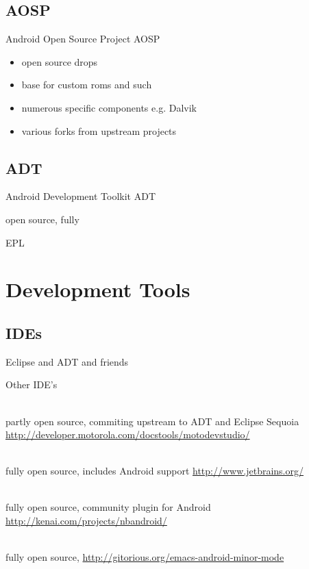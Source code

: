 \documentclass[aspectratio=169]{beamer}
\newcommand{\surl}[1] {{\tiny \url{#1}}}
\begin{document}
  \subsection{AOSP}
    \begin{frame}{Android Open Source Project AOSP}
      \begin{itemize}
        \item<1->open source drops
        \item<2->base for custom roms and such
        \item<3->numerous specific components e.g. Dalvik
        \item<4->various forks from upstream projects
      \end{itemize}
    \end{frame}

  \subsection{ADT}
    \begin{frame}{Android Development Toolkit ADT}
      \begin{description}
        \item<1->open source, fully 
        \item<2->EPL
      \end{description}
    \end{frame}

\section{Development Tools}

  \subsection{IDEs}

    \begin{frame}{Eclipse and ADT and friends}
      
    \end{frame}

    \begin{frame}{Other IDE's}
      \begin{description}
        \item<1->[Motorola Motodev Studio for Android] \hfill \\  partly open source, commiting upstream to ADT and Eclipse Sequoia \surl{http://developer.motorola.com/docstools/motodevstudio/}
        \item<2->[Jetbrains IntelliJ IDEA CE] \hfill \\ fully open source, includes Android support \surl{http://www.jetbrains.org/}
        \item<3->[Oracle Netbeans] \hfill \\ fully open source, community plugin for Android \surl{http://kenai.com/projects/nbandroid/}
        \item<4->[Emacs] \hfill \\ fully open source, \surl{http://gitorious.org/emacs-android-minor-mode}
      \end{description}
    \end{frame}
\end{document}
